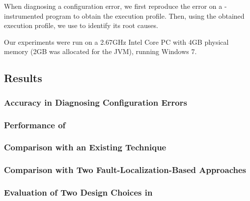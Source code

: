 When diagnosing a configuration error, we first reproduce the
error on a \ourtool-instrumented program to obtain the
execution profile. Then, using the obtained execution profile, we use \ourtool
to identify its root causes.


Our experiments were run on a
2.67GHz Intel Core PC with 4GB physical memory (2GB was allocated
for the JVM), running Windows 7.


\subsection{Results}
\label{sec:results}


\subsubsection{Accuracy in Diagnosing Configuration Errors}
\label{sec:accuracy}


\subsubsection{Performance of \ourtool}
\label{sec:performance}


\subsubsection{Comparison with an Existing Technique}
\label{sec:confanalyzer}



\subsubsection{Comparison with Two Fault-Localization-Based Approaches}
\label{sec:comparison}




\subsubsection{Evaluation of Two Design Choices in \ourtool}
\label{sec:choices}



